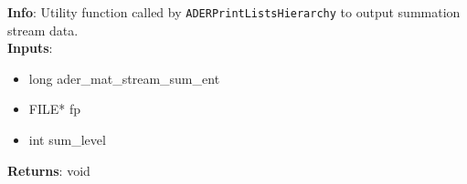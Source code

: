 \textbf{Info}: Utility function called by \texttt{ADERPrintListsHierarchy}
to output summation stream data.\\

\noindent \textbf{Inputs}:
\begin{itemize}
\item{long ader\_mat\_stream\_sum\_ent}
\item{FILE* fp}
\item{int sum\_level}
\end{itemize}

\noindent \textbf{Returns}: void
